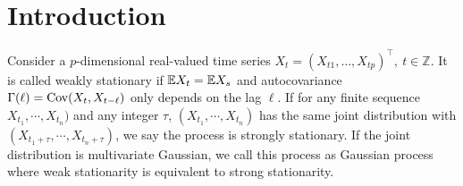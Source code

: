 \section{Introduction}\label{introduction}
Consider a $p$-dimensional real-valued time series $X_t = (X_{t1}, \ldots, X_{tp})^\top, ~ t\in \mathbb{Z}$. It is called weakly stationary if $\mathbb{E} X_t = \mathbb{E} X_s$ and  autocovariance $\Gamma(\ell) = \mbox{Cov} (X_t, X_{t-\ell})$ only depends on the lag $\ell$.  
If for any finite sequence $X_{t_1}, \cdots, X_{t_n})$ and any integer $\tau$, 
$(X_{t_1}, \cdots, X_{t_n})$ has the same joint distribution with  $(X_{t_1+\tau}, \cdots, X_{t_n+\tau})$,  we say the process is strongly stationary. If the joint distribution is multivariate Gaussian, we call this process as Gaussian process where weak stationarity is equivalent to strong stationarity. \par 

